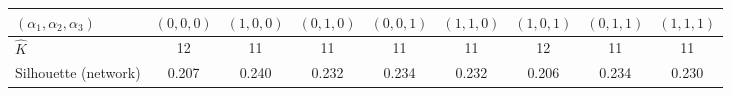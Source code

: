 \begin{tabular}{|l|c|c|c|c|c|c|c|c|}
\hline
$(\alpha_1,\alpha_2,\alpha_3)$ & $(0,0,0)$ & $(1,0,0)$ & $(0,1,0)$ & $(0,0,1)$ & $(1,1,0)$ & $(1,0,1)$ & $(0,1,1)$ & $(1,1,1)$
 \\
\hline
$\widehat{K}$ & 12 & 11 & 11 & 11 & 11 & 12 & 11 & 11
 \\
\hline
Silhouette (network) & 0.207 & 0.240 & 0.232 & 0.234 & 0.232 & 0.206 & 0.234 & 0.230
 \\
\hline
\end{tabular}
